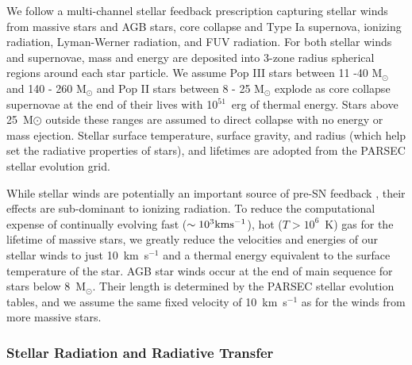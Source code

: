 \documentclass[12pt]{article} %
\begin{document}
We follow a multi-channel stellar feedback prescription capturing stellar winds from massive stars and AGB stars, core collapse and Type Ia supernova, ionizing radiation, Lyman-Werner radiation, and FUV radiation. For both stellar winds and supernovae, mass and energy are deposited into 3-zone radius spherical regions around each star particle. We assume Pop III stars between 11 -40 M$_{\odot}$ and 140 - 260 M$_{\odot}$ and Pop II stars between 8 - 25 M$_{\odot}$ explode as core collapse supernovae at the end of their lives with 10$^{51}$~erg of thermal energy. Stars above 25~M${\odot}$ outside these ranges are assumed to direct collapse with no energy or mass ejection. Stellar surface temperature, surface gravity, and radius (which help set the radiative properties of stars), and lifetimes are adopted from the PARSEC \citep{Bressan2012,Tang2014} stellar evolution grid.

While stellar winds are potentially an important source of pre-SN feedback \citep{Agertz2013}, their effects are sub-dominant to ionizing radiation. To reduce the computational expense of continually evolving fast ($\sim 10^{3} \rm{km} \rm{s}^{-1}$), hot ($T > 10^{6}$~K) gas for the lifetime of massive stars, we greatly reduce the velocities and energies of our stellar winds to just 10~km~s$^{-1}$ and a thermal energy equivalent to the surface temperature of the star. AGB star winds occur at the end of main sequence for stars below 8~M$_{\odot}$. Their length is determined by the PARSEC stellar evolution tables, and we assume the same fixed velocity of 10~km~s$^{-1}$ as for the winds from more massive stars. 
\subsubsection{Stellar Radiation and Radiative Transfer}
\end{document}
